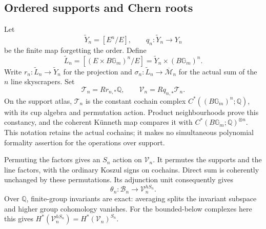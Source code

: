 \subsection{Ordered supports and Chern roots}

Let
\[
 \widetilde Y_n=[E^n/E],\qquad
 q_n:\widetilde Y_n\longrightarrow Y_n
\]
be the finite map forgetting the order. Define
\[
 \widetilde L_n=[(E\times B\mathbb G_m)^n/E]
             =\widetilde Y_n\times(B\mathbb G_m)^n.
\]
Write $r_n:\widetilde L_n\to\widetilde Y_n$ for the projection
and $\sigma_n:\widetilde L_n\to\overline{\mathcal M}_n$
for the actual sum of the $n$ line skyscrapers. Set
\[
 \mathcal T_n=Rr_{n,*}\mathbb Q,\qquad
 \mathcal V_n=Rq_{n,*}\mathcal T_n.
\]
On the support atlas, $\mathcal T_n$ is the constant cochain
complex $C^*((B\mathbb G_m)^n;\mathbb Q)$, with its cup algebra
and permutation action. Product neighbourhoods prove this
constancy, and the coherent K\"unneth map compares it with
$C^*(B\mathbb G_m;\mathbb Q)^{\otimes n}$.
This notation retains the actual cochains; it makes no simultaneous
polynomial formality assertion for the operations over support.

Permuting the factors gives an $S_n$ action on $\mathcal V_n$.
It permutes the supports and the line factors, with the ordinary
Koszul signs on cochains. Direct sum is coherently unchanged by
these permutations. Its adjunction unit consequently gives
\begin{equation}\label{sc:theta}
 \theta_n:\mathcal B_n\longrightarrow
                              \mathcal V_n^{hS_n}.
\end{equation}
Over $\mathbb Q$, finite-group invariants are exact: averaging
splits the invariant subspace and higher group cohomology vanishes.
For the bounded-below complexes here this gives
$H^*(\mathcal V_n^{hS_n})=H^*(\mathcal V_n)^{S_n}$.

